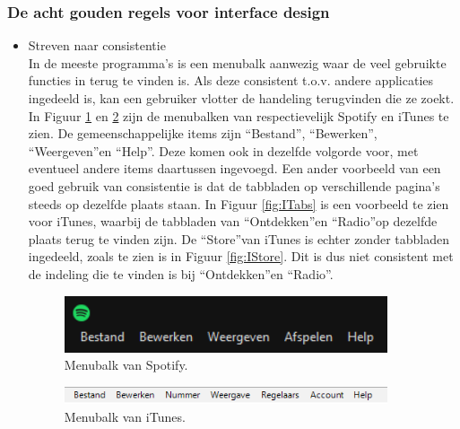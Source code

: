 \documentclass[11pt]{article}
\begin{document}
\subsubsection{De acht gouden regels voor interface design}
\begin{itemize}
	\item Streven naar consistentie\\
	In de meeste programma's is een menubalk aanwezig waar de veel gebruikte functies in terug te vinden is. Als deze consistent t.o.v. andere applicaties ingedeeld is, kan een gebruiker vlotter de handeling terugvinden die ze zoekt. In Figuur \ref{fig:SMenubalk} en \ref{fig:IMenubalk} zijn de menubalken van respectievelijk Spotify en iTunes te zien. De gemeenschappelijke items zijn \textquotedblleft Bestand\textquotedblright, \textquotedblleft Bewerken\textquotedblright, \textquotedblleft Weergeven\textquotedblright en \textquotedblleft Help\textquotedblright. Deze komen ook in dezelfde volgorde voor, met eventueel andere items daartussen ingevoegd. Een ander voorbeeld van een goed gebruik van consistentie is dat de tabbladen op verschillende pagina's steeds op dezelfde plaats staan. In Figuur \ref{fig:ITabs} is een voorbeeld te zien voor iTunes, waarbij de tabbladen van \textquotedblleft Ontdekken\textquotedblright en \textquotedblleft Radio\textquotedblright op dezelfde plaats terug te vinden zijn. De \textquotedblleft Store\textquotedblright van iTunes is echter zonder tabbladen ingedeeld, zoals te zien is in Figuur \ref{fig:IStore}. Dit is dus niet consistent met de indeling die te vinden is bij \textquotedblleft Ontdekken\textquotedblright en \textquotedblleft Radio\textquotedblright.
	\begin{figure}
		\centering
		\includegraphics[width=0.9\textwidth]{SMenubalk.png}
		\caption{Menubalk van Spotify.}
		\label{fig:SMenubalk}
	\end{figure}
	\begin{figure}
	\centering
	\includegraphics[width=0.9\textwidth]{IMenubalk.png}
	\caption{Menubalk van iTunes.}
	\label{fig:IMenubalk}
	\end{figure}
	\begin{figure}

\end{figure}
\end{itemize}
\end{document}
